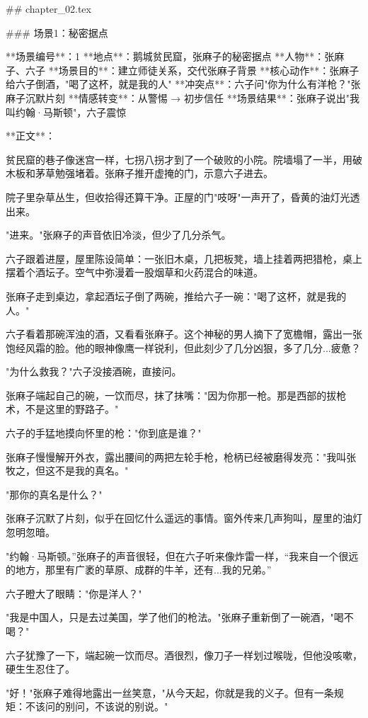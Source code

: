 ## chapter_02.tex

### 场景1：秘密据点

**场景编号**：1  
**地点**：鹅城贫民窟，张麻子的秘密据点  
**人物**：张麻子、六子  
**场景目的**：建立师徒关系，交代张麻子背景  
**核心动作**：张麻子给六子倒酒，"喝了这杯，就是我的人"  
**冲突点**：六子问"你为什么有洋枪？"张麻子沉默片刻  
**情感转变**：从警惕 → 初步信任  
**场景结果**：张麻子说出"我叫约翰·马斯顿"，六子震惊

**正文**：

贫民窟的巷子像迷宫一样，七拐八拐才到了一个破败的小院。院墙塌了一半，用破木板和茅草勉强堵着。张麻子推开虚掩的门，示意六子进去。

院子里杂草丛生，但收拾得还算干净。正屋的门"吱呀"一声开了，昏黄的油灯光透出来。

"进来。"张麻子的声音依旧冷淡，但少了几分杀气。

六子跟着进屋，屋里陈设简单：一张旧木桌，几把板凳，墙上挂着两把猎枪，桌上摆着个酒坛子。空气中弥漫着一股烟草和火药混合的味道。

张麻子走到桌边，拿起酒坛子倒了两碗，推给六子一碗："喝了这杯，就是我的人。"

六子看着那碗浑浊的酒，又看看张麻子。这个神秘的男人摘下了宽檐帽，露出一张饱经风霜的脸。他的眼神像鹰一样锐利，但此刻少了几分凶狠，多了几分...疲惫？

"为什么救我？"六子没接酒碗，直接问。

张麻子端起自己的碗，一饮而尽，抹了抹嘴："因为你那一枪。那是西部的拔枪术，不是这里的野路子。"

六子的手猛地摸向怀里的枪："你到底是谁？"

张麻子慢慢解开外衣，露出腰间的两把左轮手枪，枪柄已经被磨得发亮："我叫张牧之，但这不是我的真名。"

"那你的真名是什么？"

张麻子沉默了片刻，似乎在回忆什么遥远的事情。窗外传来几声狗叫，屋里的油灯忽明忽暗。

"约翰·马斯顿。”张麻子的声音很轻，但在六子听来像炸雷一样，“我来自一个很远的地方，那里有广袤的草原、成群的牛羊，还有...我的兄弟。”

六子瞪大了眼睛："你是洋人？"

"我是中国人，只是去过美国，学了他们的枪法。"张麻子重新倒了一碗酒，"喝不喝？"

六子犹豫了一下，端起碗一饮而尽。酒很烈，像刀子一样划过喉咙，但他没咳嗽，硬生生忍住了。

"好！"张麻子难得地露出一丝笑意，"从今天起，你就是我的义子。但有一条规矩：不该问的别问，不该说的别说。"

